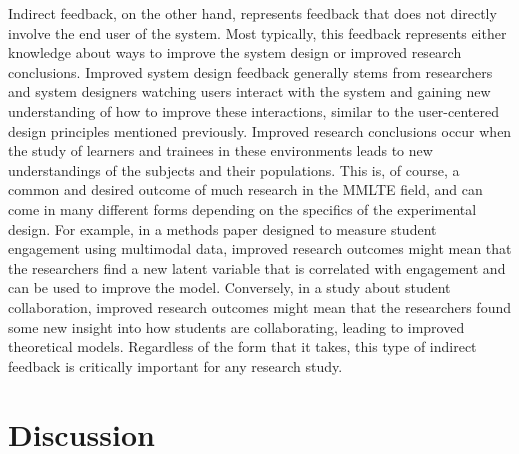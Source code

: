 \documentclass[manuscript,screen,review]{acmart}
\begin{document}
Indirect feedback, on the other hand, represents feedback that does not directly involve the end user of the system. Most typically, this feedback represents either knowledge about ways to improve the system design or improved research conclusions. Improved system design feedback generally stems from researchers and system designers watching users interact with the system and gaining new understanding of how to improve these interactions, similar to the user-centered design principles mentioned previously. Improved research conclusions occur when the study of learners and trainees in these environments leads to new understandings of the subjects and their populations. This is, of course, a common and desired outcome of much research in the MMLTE field, and can come in many different forms depending on the specifics of the experimental design. For example, in a methods paper designed to measure student engagement using multimodal data, improved research outcomes might mean that the researchers find a new latent variable that is correlated with engagement and can be used to improve the model. Conversely, in a study about student collaboration, improved research outcomes might mean that the researchers found some new insight into how students are collaborating, leading to improved theoretical models. Regardless of the form that it takes, this type of indirect feedback is critically important for any research study.

\section{Discussion} \label{sec:discussion}
\end{document}
